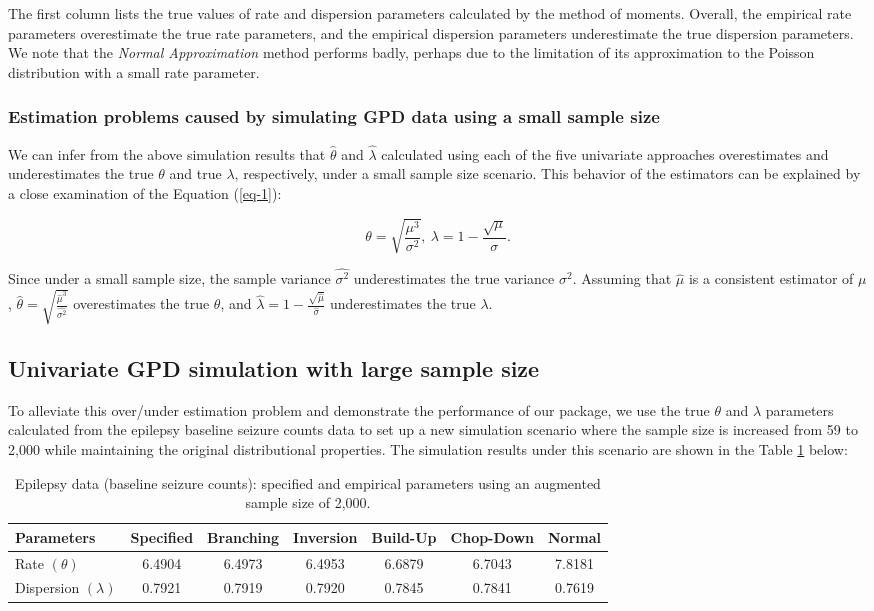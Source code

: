 The first column lists the true values of rate and dispersion parameters calculated by the method of moments. Overall, the empirical rate parameters overestimate the true rate parameters, and the empirical dispersion parameters underestimate the true dispersion parameters. We note that the \textit{Normal Approximation} method performs badly, perhaps due to the limitation of its approximation to the Poisson distribution with a small rate parameter.


\subsubsection{Estimation problems caused by simulating GPD data using a small sample size}

We can infer from the above simulation results that $\hat{\theta}$ and $\hat{\lambda}$ calculated using each of the five univariate approaches overestimates and underestimates the true $\theta$ and true $\lambda$, respectively, under a small sample size scenario. This behavior of the estimators can be explained by a close examination of the Equation (\ref{eq-1}): 

$$
\theta = \sqrt{\frac{\mu^3}{\sigma^2}}, \ \lambda = 1 - \frac{\sqrt{\mu}}{\sigma}.
$$ 

Since under a small sample size, the sample variance $\hat{\sigma^2}$ underestimates the true variance $\sigma^2$. Assuming that $\hat{\mu}$ is a consistent estimator of $\mu$, $\hat{\theta} = \sqrt{\frac{\hat{\mu}^3}{\hat{\sigma^2}}}$ overestimates the true $\theta$, and $\hat{\lambda} = 1 - \frac{\sqrt{\hat{\mu}}}{\hat{\sigma}}$ underestimates the true $\lambda$.

\subsection{Univariate GPD simulation with large sample size}

To alleviate this over/under estimation problem and demonstrate the performance of our package, we use the true $\theta$ and $\lambda$ parameters calculated from the epilepsy baseline seizure counts data to set up a new simulation scenario where the sample size is increased from 59 to 2,000 while maintaining the original distributional properties. The simulation results under this scenario are shown in the Table \ref{t-3e2} below:

\begin{table}[ht]
\caption{Epilepsy data  (baseline seizure counts): specified and empirical parameters using an augmented sample size of 2,000.} 
\centering
\begin{tabularx}{1.0\linewidth}{lcccccc} 
\toprule
Parameters & Specified & Branching & Inversion & Build-Up & Chop-Down & Normal\\ [0.5ex] 
\midrule
Rate $(\theta)$        & 6.4904 & 6.4973 & 6.4953 & 6.6879 & 6.7043 & 7.8181 \\
Dispersion $(\lambda)$ & 0.7921 & 0.7919 & 0.7920 & 0.7845 & 0.7841 & 0.7619 \\
\bottomrule
\end{tabularx}
\label{t-3e2} 
\end{table}

